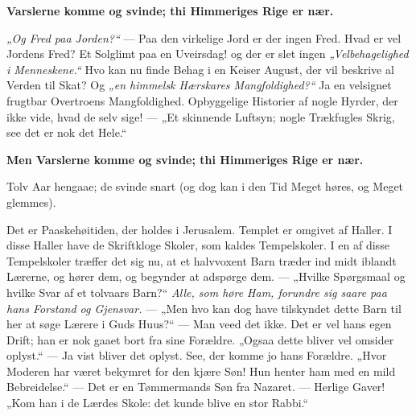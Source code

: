 \documentclass[12pt,a4paper]{book}
\begin{document}
\textbf{Varslerne komme og svinde; thi Himmeriges Rige er nær.}

\emph{„Og Fred paa Jorden?“} --- Paa den virkelige Jord er der ingen Fred. Hvad
er vel Jordens Fred? Et Solglimt paa en Uveirsdag! og der er slet ingen
\emph{„Velbehagelighed i Menneskene.“} Hvo kan nu finde Behag i en Keiser
August, der
vil beskrive al Verden til Skat? Og \emph{„en himmelsk Hærskares
Mangfoldighed?“} Ja en velsignet frugtbar Overtroens Mangfoldighed. Opbyggelige
Historier af nogle Hyrder, der ikke vide, hvad de selv sige! --- „Et skinnende
Luftsyn; nogle Trækfugles Skrig, see det er nok det Hele.“

\textbf{Men Varslerne komme og svinde; thi Himmeriges Rige er nær.}

Tolv Aar hengaae; de svinde snart (og dog kan i den Tid Meget høres, og Meget
glemmes).

Det er Paaskehøitiden, der holdes i Jerusalem. Templet er omgivet af Haller. I
disse Haller have de Skriftkloge Skoler, som kaldes Tempelskoler. I en af disse
Tempelskoler træffer det sig nu, at et halvvoxent Barn træder ind midt iblandt
Lærerne, og hører dem, og begynder at adspørge dem. --- „Hvilke Spørgsmaal og
hvilke Svar af et tolvaars Barn?“ \emph{Alle, som høre Ham, forundre sig saare
paa hans Forstand og Gjensvar.} --- „Men hvo kan dog have tilskyndet dette Barn
til her at søge Lærere i Guds Huus?“ --- Man veed det ikke. Det er vel hans egen
Drift; han er nok gaaet bort fra sine Forældre. „Ogsaa dette bliver vel omsider
oplyst.“ --- Ja vist bliver det oplyst. See, der komme jo hans Forældre. „Hvor
Moderen har været bekymret for den kjære Søn! Hun henter ham med en mild
Bebreidelse.“ --- Det er en Tømmermands Søn fra Nazaret. --- Herlige Gaver! „Kom
han i de Lærdes Skole: det kunde blive en stor Rabbi.“
\end{document}
